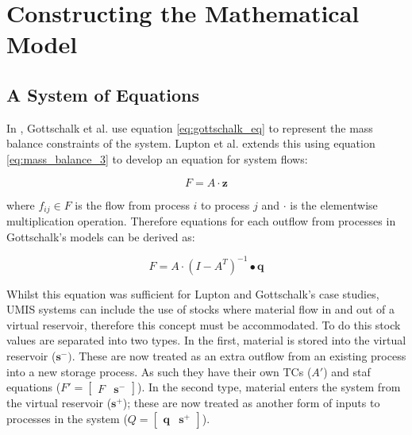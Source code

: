 \documentclass[ %
                    author={Tom Jager},
                supervisor={Dr. Daniel Schien},
                    degree={MEng},
                     title={A Bayesian Inference Engine for Calibrating Uncertainty over UMIS Structured MFA Systems},
                  subtitle={},
                      type={research},
                      year={2019} ]{dissertation}
\begin{document}
\section{Constructing the Mathematical Model}
\subsection{A System of Equations}
In \cite{gottschalk2010probabilistic}, Gottschalk et al. use equation \ref{eq:gottschalk_eq} to represent the mass balance constraints of the system. Lupton et al. extends this using equation \ref{eq:mass_balance_3}  to develop an equation for system flows:

\begin{equation}
    F=A \cdot \bm{z}
\end{equation}

where $f_{ij} \in F$ is the flow from process $i$ to process $j$ and $\cdot$ is the elementwise multiplication operation. Therefore equations for each outflow from processes in Gottschalk's models can be derived as:

\begin{equation}
    F=A \cdot (I-A^T)^{-1} \bullet \bm{q}
\end{equation}


Whilst this equation was sufficient for Lupton and Gottschalk's case studies, UMIS systems can include the use of stocks where material flow in and out of a virtual reservoir, therefore this concept must be accommodated. To do this stock values are separated into two types. In the first, material is stored into the virtual reservoir ($\bm{s^-})$. These are now treated as an extra outflow from an existing process into a new storage process. As such they have their own TCs ($A'$) and staf equations ($F' = \begin{bmatrix}
F & \bm{s^-}
\end{bmatrix}$). In the second type, material enters the system from the virtual reservoir ($\bm{s^+}$); these are now treated as another form of inputs to processes in the system ($Q = \begin{bmatrix}\bm{q} & \bm{s^+}
\end{bmatrix}
$).
\end{document}
